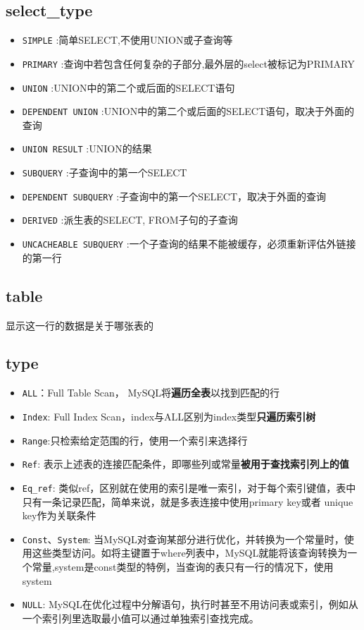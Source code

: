 \documentclass[UTF8,a4paper,12pt]{ctexbook}
\begin{document}
		\subsection{select\_type}
			\begin{itemize}
				\item \verb|SIMPLE|  :简单SELECT,不使用UNION或子查询等
				\item \verb|PRIMARY| :查询中若包含任何复杂的子部分,最外层的select被标记为PRIMARY
				\item \verb|UNION| :UNION中的第二个或后面的SELECT语句
				\item \verb|DEPENDENT UNION| :UNION中的第二个或后面的SELECT语句，取决于外面的查询
				\item \verb|UNION RESULT| :UNION的结果
				\item \verb|SUBQUERY| :子查询中的第一个SELECT
				\item \verb|DEPENDENT SUBQUERY| :子查询中的第一个SELECT，取决于外面的查询
				\item \verb|DERIVED| :派生表的SELECT, FROM子句的子查询
				\item \verb|UNCACHEABLE SUBQUERY| :一个子查询的结果不能被缓存，必须重新评估外链接的第一行
			\end{itemize}
			
		\subsection{table}	
			显示这一行的数据是关于哪张表的
			
		\subsection{type}
			
			\begin{itemize}
				\item \verb|ALL|：Full Table Scan， MySQL将\textbf{遍历全表}以找到匹配的行
				\item \verb|Index|: Full Index Scan，index与ALL区别为index类型\textbf{只遍历索引树}
				\item \verb|Range|:只检索给定范围的行，使用一个索引来选择行
				\item \verb|Ref|: 表示上述表的连接匹配条件，即哪些列或常量\textbf{被用于查找索引列上的值}
				\item \verb|Eq_ref|: 	类似ref，区别就在使用的索引是唯一索引，对于每个索引键值，表中只有一条记录匹配，简单来说，就是多表连接中使用primary key或者 unique key作为关联条件
				\item \verb|Const|、\verb|System|: 当MySQL对查询某部分进行优化，并转换为一个常量时，使用这些类型访问。如将主键置于where列表中，MySQL就能将该查询转换为一个常量,system是const类型的特例，当查询的表只有一行的情况下，使用system
				\item \verb|NULL|: MySQL在优化过程中分解语句，执行时甚至不用访问表或索引，例如从一个索引列里选取最小值可以通过单独索引查找完成。
			\end{itemize}
			
\end{document}

